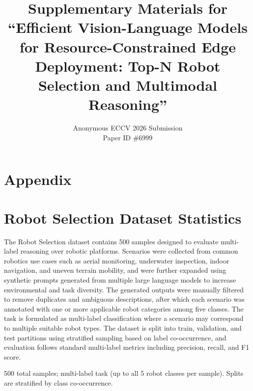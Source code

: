 \documentclass[runningheads]{llncs}
\begin{document}
\raggedbottom
\sloppy
\title{Supplementary Materials for ``Efficient Vision-Language Models for Resource-Constrained Edge Deployment: Top-N Robot Selection and Multimodal Reasoning''}
\author{Anonymous ECCV 2026 Submission\\Paper ID \#6999}
\institute{}
\maketitle

\section*{Appendix}

\section{Robot Selection Dataset Statistics}
\label{sec:supp-dataset}

The Robot Selection dataset contains 500 samples designed to evaluate multi-label reasoning over robotic platforms. Scenarios were collected from common robotics use cases such as aerial monitoring, underwater inspection, indoor navigation, and uneven terrain mobility, and were further expanded using synthetic prompts generated from multiple large language models to increase environmental and task diversity. The generated outputs were manually filtered to remove duplicates and ambiguous descriptions, after which each scenario was annotated with one or more applicable robot categories among five classes. The task is formulated as multi-label classification where a scenario may correspond to multiple suitable robot types. The dataset is split into train, validation, and test partitions using stratified sampling based on label co-occurrence, and evaluation follows standard multi-label metrics including precision, recall, and F1 score.

500 total samples; multi-label task (up to all 5 robot classes per sample). Splits are stratified by class co-occurrence.
\end{document}
